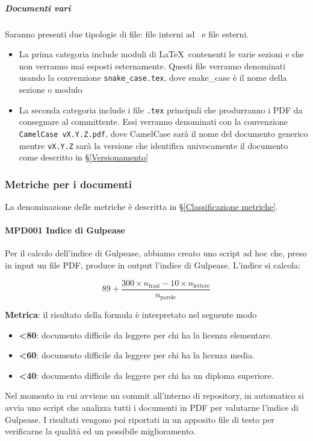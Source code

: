 			\subparagraph{Documenti vari}
			Saranno presenti due tipologie di file: file interni ad \gruppo\ e file esterni.
			\begin{itemize}
				\item La prima categoria include moduli di \LaTeX\ contenenti le varie sezioni e che non verranno mai esposti esternamente. Questi file verranno
					denominati usando la convenzione \texttt{snake\_case.tex}, dove snake\_case è il nome della sezione o modulo
				\item La seconda categoria include i file \texttt{.tex} principali che produrranno i PDF da consegnare al committente. Essi verranno denominati
				con la convenzione \mbox{\texttt{CamelCase vX.Y.Z.pdf}}, dove CamelCase sarà il nome del documento generico mentre \texttt{vX.Y.Z}
				sarà la versione che identifica univocamente il documento come descritto in \S\ref{Versionamento}
			\end{itemize}
		
		\subsubsection{Metriche per i documenti}\label{ProcessiSupportoMetriche}
		La denominazione delle metriche è descritta in \S\ref{Classificazione metriche}.
		
			\paragraph{MPD001 Indice di Gulpease}
			Per il calcolo dell'indice di Gulpease, abbiamo creato uno script ad hoc che, preso in input un file PDF, produce in output l'indice di Gulpease.
			L'indice si calcola:

			\[89+\dfrac{300\times n_{\text{frasi}}-10\times n_{\text{lettere}}}{n_{\text{parole}}}\]
			
			\textbf{Metrica}: il risultato della formula è interpretato nel seguente modo

			\begin{itemize}
				\item \textbf{<80}: documento  difficile da leggere per chi ha la licenza elementare.
				\item \textbf{<60}: documento  difficile da leggere per chi ha la licenza media.
				\item \textbf{<40}: documento difficile da leggere per chi ha un diploma superiore.
			\end{itemize}

			Nel momento in cui avviene un commit all'interno di repository, in automatico si avvia uno script che analizza tutti i documenti in PDF per valutarne
			l'indice di Gulpease. I risultati vengono poi riportati in un apposito file di testo per verificarne la qualità ed un possibile miglioramento.

